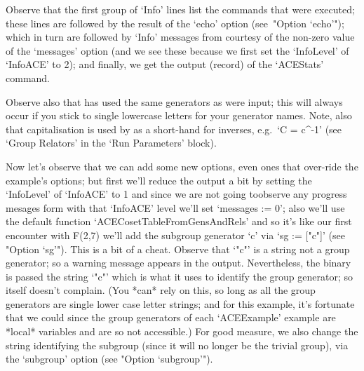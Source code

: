 Observe that the first group of `Info' lines list  the  commands  that
were executed; these lines are followed by the result  of  the  `echo'
option (see~"Option `echo'"); which in turn  are  followed  by  `Info'
messages from {\ACE} courtesy of the non-zero value of the  `messages'
option (and we see these because  we  first  set  the  `InfoLevel'  of
`InfoACE' to 2); and finally,  we  get  the  output  (record)  of  the
`ACEStats' command.

Observe also that {\ACE} has used the same generators as  were  input;
this will always occur if you stick to single  lowercase  letters  for
your generator names. Note, also that capitalisation is used by {\ACE}
as a short-hand for inverses, e.g.~`C = c^-1' (see `Group Relators' in
the {\ACE} \lq{}Run Parameters' block).

Now let's observe that we can add some new  options,  even  ones  that
over-ride the example's options; but first we'll reduce the  output  a
bit by setting the `InfoLevel' of `InfoACE' to 1 and since we are  not
going toobserve any progress mesages form {\ACE} with  that  `InfoACE'
level we'll set `messages := 0'; also we'll use the  default  function
`ACECosetTableFromGensAndRels' and so it's like  our  first  encounter
with F(2,7) we'll add the subgroup generator `c'  via  `sg  :=  ["c"]'
(see "Option `sg'"). This is a bit of a cheat. Observe that `"c"' is a
string not a {\GAP} group generator; so a warning message  appears  in
the output. Nevertheless, the {\ACE} binary is passed the string `"c"'
which is what it uses to  identify  the  {\GAP}  group  generator;  so
{\ACE} itself doesn't complain. (You *can* rely on this,  so  long  as
all the {\GAP} group generators are single lower case letter  strings;
and for this example, it's fortunate that we  could  since  the  group
generators of each `ACEExample' example are *local* variables and  are
so not accessible.) For  good  measure,  we  also  change  the  string
identifying the subgroup (since it  will  no  longer  be  the  trivial
group), via the `subgroup' option (see "Option `subgroup'").

